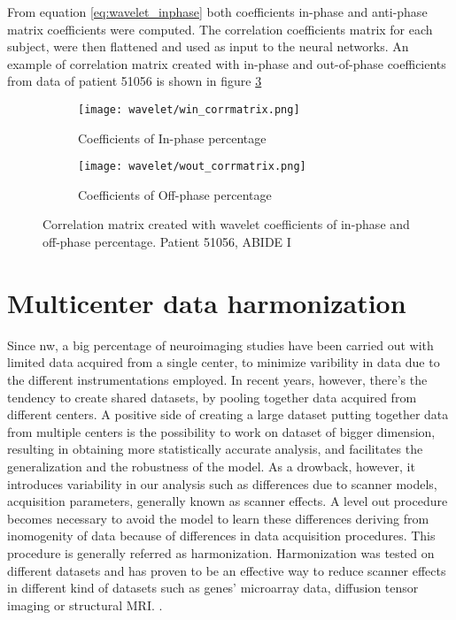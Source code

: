\documentclass[11pt]{report}
\begin{document}
From equation \ref{eq:wavelet_inphase} both coefficients in-phase and anti-phase matrix coefficients were computed.
The correlation coefficients matrix for each subject, were then flattened and used as input to the neural networks.
An example of correlation matrix created with in-phase and out-of-phase coefficients from data of patient 51056 is shown in figure \ref{fig:win_wout}



\begin{figure}
\centering
\begin{subfigure}{0.45\textwidth}
\texttt{[image: wavelet/win\_corrmatrix.png]}
\caption{Coefficients of In-phase percentage}
\label{}
\end{subfigure}
\begin{subfigure}{0.45\textwidth}
\texttt{[image: wavelet/wout\_corrmatrix.png]}
\caption{Coefficients of Off-phase percentage}
\label{}
\end{subfigure}
\caption{Correlation matrix created with wavelet coefficients of in-phase and off-phase percentage. Patient 51056, ABIDE I }
\label{fig:win_wout}
\end{figure}



\newpage


\chapter{Multicenter data harmonization}\label{chap:harmonization_theory}
Since nw, a big percentage of neuroimaging studies have been carried out with limited data acquired from a single center, to minimize varibility in data due to the different instrumentations employed.
In recent years, however, there's the tendency to create shared datasets, by pooling together data acquired from different centers.
A positive side of creating a large dataset putting together data from multiple centers is the possibility to work on dataset of bigger dimension, resulting in obtaining more statistically accurate analysis, and facilitates the generalization and the robustness of the model.
As a drowback, however, it introduces variability in our analysis such as differences due to scanner models, acquisition parameters, generally known as scanner effects.
A level out procedure becomes necessary to avoid the model to learn these differences deriving from inomogenity of data because of differences in data acquisition procedures.
This procedure is generally referred as harmonization.
Harmonization was tested on different datasets and has proven to be an effective way to reduce scanner effects  in different kind of datasets such as genes' microarray data, diffusion tensor imaging or structural MRI. \cite{johnson-2006} \cite{fortin-2017} \cite{lombardi2020}.
\end{document}
